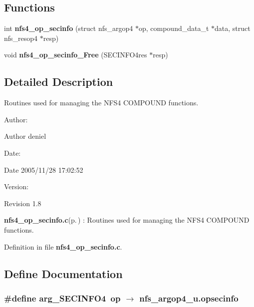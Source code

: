 \subsection*{Functions}
\begin{CompactItemize}
\item 
int {\bf nfs4\_\-op\_\-secinfo} (struct nfs\_\-argop4 $\ast$op, compound\_\-data\_\-t $\ast$data, struct nfs\_\-resop4 $\ast$resp)
\item 
void {\bf nfs4\_\-op\_\-secinfo\_\-Free} (SECINFO4res $\ast$resp)
\end{CompactItemize}


\subsection{Detailed Description}
Routines used for managing the NFS4 COMPOUND functions. 

\begin{Desc}
\item[Author:]\begin{Desc}
\item[Author]deniel \end{Desc}
\end{Desc}
\begin{Desc}
\item[Date:]\begin{Desc}
\item[Date]2005/11/28 17:02:52 \end{Desc}
\end{Desc}
\begin{Desc}
\item[Version:]\begin{Desc}
\item[Revision]1.8 \end{Desc}
\end{Desc}
{\bf nfs4\_\-op\_\-secinfo.c}{\rm (p.\,\pageref{nfs4__op__secinfo_8c})} : Routines used for managing the NFS4 COMPOUND functions.

Definition in file {\bf nfs4\_\-op\_\-secinfo.c}.

\subsection{Define Documentation}
\subsubsection{\setlength{\rightskip}{0pt plus 5cm}\#define arg\_\-SECINFO4\ op $\rightarrow$ nfs\_\-argop4\_\-u.opsecinfo}\label{nfs4__op__secinfo_8c_a0}


